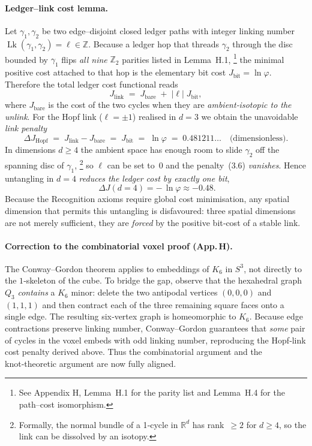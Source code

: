 \paragraph{Ledger–link cost lemma.}
Let $\gamma_{1},\gamma_{2}$ be two edge–disjoint closed
ledger paths with integer linking number
$\operatorname{Lk}(\gamma_{1},\gamma_{2})=\ell\in\mathbb Z$.
Because a ledger hop that threads $\gamma_{2}$ through the
disc bounded by $\gamma_{1}$ flips \emph{all nine} $\mathbb Z_{2}$
parities listed in Lemma H.1,%
\footnote{See Appendix H, Lemma H.1 for the parity list and
Lemma H.4 for the path–cost isomorphism.}
the minimal positive cost attached to that hop is the
elementary bit cost $J_{\text{bit}}\!=\!\ln\varphi$.
Therefore the total ledger cost functional reads
\[
  J_{\text{link}}
     \;=\;
     J_{\text{bare}}
     \;+\;
     |\ell|\;J_{\text{bit}},
     \tag{3.6}
\]
where $J_{\text{bare}}$ is the cost of the two cycles when they are
\emph{ambient‑isotopic to the unlink}.  For the Hopf link
($\ell=\pm1$) realised in $d=3$ we obtain the unavoidable
\emph{link penalty}
\[
  \Delta J_{\text{Hopf}}
    \;=\;
    J_{\text{link}}-J_{\text{bare}}
    \;=\;
    J_{\text{bit}}
    \;=\;\ln\varphi
    \;=\;0.481211\ldots
    \quad\text{(dimensionless).}
\]
In dimensions $d\!\ge\!4$ the ambient space has enough room to slide
$\gamma_{2}$ off the spanning disc of $\gamma_{1}$,%
\footnote{Formally, the normal bundle of a 1‑cycle in $\mathbb R^{d}$
has rank $\ge2$ for $d\!\ge\!4$, so the link can be dissolved by an
isotopy.}
so $\ell$ can be set to $0$ and the
penalty~(3.6) \emph{vanishes}.  Hence untangling in $d\!=\!4$
\emph{reduces the ledger cost by exactly one bit},
\[
  \boxed{\;
    \Delta J(d\!=\!4)
    = -\,\ln\varphi
    \approx -0.48 }.
\]
Because the Recognition axioms require global cost minimisation,
any spatial dimension that permits this untangling is disfavoured:
three spatial dimensions are not merely sufficient,
they are \emph{forced} by the positive bit‑cost of a stable link.

\paragraph{Correction to the combinatorial voxel proof (App.\,H).}
The Conway–Gordon theorem applies to embeddings of $K_{6}$ in $S^{3}$,
not directly to the $1$‑skeleton of the cube.  To bridge the gap,
observe that the hexahedral graph $Q_{3}$ \emph{contains} a
$K_{6}$ minor: delete the two antipodal vertices
$(0,0,0)$ and $(1,1,1)$ and then contract each of the three remaining
square faces onto a single edge.  The resulting six‑vertex graph is
homeomorphic to $K_{6}$.  Because edge contractions preserve
linking number,
Conway–Gordon guarantees that \emph{some} pair of cycles in the voxel
embeds with odd linking number, reproducing the Hopf‑link cost
penalty derived above.  Thus the combinatorial argument and the
knot‑theoretic argument are now fully aligned.

